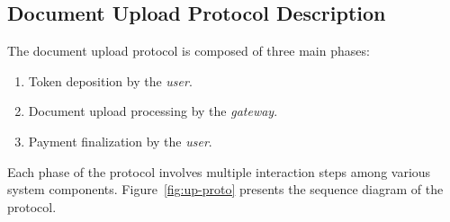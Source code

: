\subsection{Document Upload Protocol Description}
The document upload protocol is composed of three main phases:
\begin{enumerate}
\item Token deposition by the {\it user}.
\item Document upload processing by the {\it gateway}.
\item Payment finalization by the {\it user}.
\end{enumerate}
Each phase of the protocol involves multiple interaction steps among various system components. Figure~\ref{fig:up-proto} presents the sequence diagram of the protocol.
